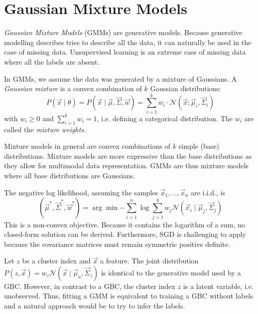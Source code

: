 \section{Gaussian Mixture Models}
\emph{Gaussian Mixture Models} (GMMs) are generative models.
Because generative modelling describes tries to describe all
the data, it can naturally be used in the case of missing data.
Unsupervised learning is an extreme case of missing data
where all the labels are absent.

In GMMs, we assume the data was generated by a mixture of Gaussians.
A \emph{Gaussian mixture} is a convex combination of
$k$ Gaussian distributions:
\begin{equation*}
    P(\vec{x} \mid \theta)
    = P(\vec{x} \mid \vec{\mu}, \vec{\Sigma}, \vec{w})
    = \sum_{i=1}^k{
        w_i \cdot \mathcal{N}(\vec{x} ; \vec{\mu}_i, \vec{\Sigma}_i)
    }
\end{equation*}
with $w_i \geq 0$ and $\sum_{i=1}^k{w_i} = 1$,
i.e. defining a categorical distribution.
The $w_i$ are called the \emph{mixture weights}.

Mixture models in general are convex combinations
of $k$ simple (base) distributions.
Mixture models are more expressive than
the base distributions as they allow
for multimodal data representation.
GMMs are thus mixture models where all
base distributions are Gaussians.

The negative log likelihood,
assuming the samples $\vec{x}_1, \dotsc, \vec{x}_n$
are i.i.d., is
\begin{equation*}
    (\vec{\mu}^*, \vec{\Sigma}^*, \vec{w}^*)
    = \arg\min{
        -\sum_{i=1}^n{\log{
            \sum_{j=1}^k{
            w_j \mathcal{N}(\vec{x}_i \mid \vec{\mu}_j, \vec{\Sigma}_j)
            }
        }}
    }
\end{equation*}
This is a non-convex objective.
Because it contains the logarithm of a sum,
no closed-form solution can be derived.
Furthermore, SGD is challenging to apply because
the covariance matrices must remain symmetric positive definite.

Let $z$ be a cluster index and $\vec{x}$ a feature.
The joint distribution
$P(z, \vec{x}) = w_z \mathcal{N}(\vec{x} \mid \vec{\mu}_u, \vec{\Sigma}_z)$
is identical to the generative model used by a GBC.
However, in contrast to a GBC, the cluster index
$z$ is a latent variable, i.e. unobserved.
Thus, fitting a GMM is equivalent to training
a GBC without labels and
a natural approach would be to try to infer the labels.


